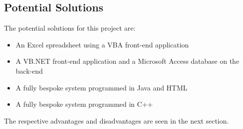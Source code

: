 \documentclass[
11pt, %
a4paper, %
oneside, %
headinclude,footinclude, %
BCOR5mm, %
]{scrartcl}
\begin{document}
\subsection{Potential Solutions}
The potential solutions for this project are:\begin{itemize}
	\item An Excel spreadsheet using a VBA front-end application
	\item A VB.NET front-end application and a Microsoft Access database on the back-end
	\item A fully bespoke system programmed in Java and HTML
	\item A fully bespoke system programmed in C++
\end{itemize}
The respective advantages and disadvantages are seen in the next section.
\end{document}
